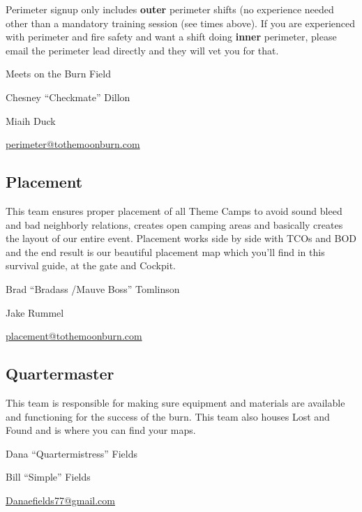Perimeter signup only includes \textbf{outer} perimeter shifts (no experience needed other than a mandatory training session (see times above). If you are experienced with perimeter and fire safety and want a shift doing \textbf{inner} perimeter, please email the perimeter lead directly and they will vet you for that.

Meets on the Burn Field

\begin{description}[leftmargin=6em,noitemsep,style=nextline]
   \item[Lead:] Chesney ``Checkmate'' Dillon
   \item[Co-leads:] Miaih Duck %
   \item[Contact:] \url{perimeter@tothemoonburn.com}
\end{description}


\subsection*{Placement}
This team ensures proper placement of all Theme Camps to avoid sound bleed and bad neighborly relations, creates open camping areas and basically creates the layout of our entire event. Placement works side by side with TCOs and BOD and the end result is our beautiful placement map which you'll find in this survival guide, at the gate and Cockpit. 
\begin{description}[leftmargin=6em,noitemsep,style=nextline]
   \item[Lead:] Brad ``Bradass /Mauve Boss'' Tomlinson
   \item[Co-leads:] Jake Rummel
   \item[Contact:] \url{placement@tothemoonburn.com}
\end{description}


\subsection*{Quartermaster}
This team is responsible for making sure equipment and materials are available and functioning for the success of the burn. This team also houses Lost and Found and is where you can find your maps.

\begin{description}[leftmargin=6em,noitemsep,style=nextline]
   \item[Lead:] Dana ``Quartermistress'' Fields
   \item[Co-leads:] Bill ``Simple'' Fields
   \item[Contact:] \url{Danaefields77@gmail.com}
\end{description}

